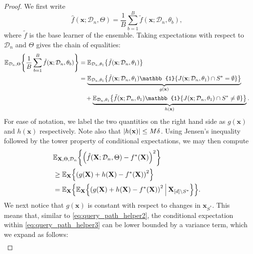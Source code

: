 \documentclass[11pt]{article}
\newcommand{\bx}{\mathbf{x}}
\newcommand{\bX}{\mathbf{X}}
\DeclarePairedDelimiter{\braces}{\lbrace}{\rbrace}
\DeclarePairedDelimiter{\paren}{(}{)}
\DeclarePairedDelimiter{\abs}{|}{|}
\newcommand{\E}{\mathbb{E}}
\newcommand{\indicator}{\mathbb{1}}
\newcommand{\nfeats}{d}
\newcommand{\coordindices}{[\nfeats]}
\newcommand{\data}[1][n]{\mathcal{D}_{#1}}
\newcommand{\suppset}{S^*}
\begin{document}
\begin{proof}
    We first write
    \begin{equation}
        \hat f(\bx;\data,\Theta) = \frac{1}{B}\sum_{b=1}^B \tilde f(\bx;\data,\theta_b),
    \end{equation}
    where $\tilde f$ is the base learner of the ensemble.
    Taking expectations with respect to $\data$ and $\Theta$ gives the chain of equalities:
    \begin{equation}
        \begin{split}
            \E_{\data,\Theta}\braces*{\frac{1}{B}\sum_{b=1}^B \tilde f(\bx;\data,\theta_b)}
            & = \E_{\data,\theta_1}\braces*{\tilde f(\bx;\data,\theta_1)} \\
            & = \underbrace{\E_{\data,\theta_1}\braces*{\tilde f(\bx;\data,\theta_1)\indicator\braces*{J(\bx;\data,\theta_1)\cap \suppset = \emptyset }}}_{g(\bx)} \\
            & \quad + \underbrace{\E_{\data,\theta_1}\braces*{\tilde f(\bx;\data,\theta_1)\indicator\braces*{J(\bx;\data,\theta_1)\cap \suppset \neq \emptyset }}}_{h(\bx)}.
        \end{split}
    \end{equation}
    For ease of notation, we label the two quantities on the right hand side as $g(\bx)$ and $h(\bx)$ respectively.
    Note also that $\abs*{h(\bx)} \leq M\delta$.
    Using Jensen's inequality followed by the tower property of conditional expectations, we may then compute 
    \begin{equation}
    \label{eq:query_path_helper3}
    \begin{split}
        & \E_{\bX,\Theta,\data}\braces*{\paren*{\hat f(\bX;\data,\Theta) - f^*(\bX)}^2} \\
        & \geq \E_\bX\braces*{\paren*{g(\bX) + h(\bX) - f^*(\bX)}^2} \\
        & = \E_\bX\braces*{\E_{\bX}\braces*{\paren*{g(\bX) + h(\bX) - f^*(\bX)}^2~\vline~ \bX_{\coordindices\backslash\suppset}}}.
    \end{split}
    \end{equation}
    We next notice that $g(\bx)$ is constant with respect to changes in $\bx_{\suppset}$.
    This means that, similar to \eqref{eq:query_path_helper2}, the conditional expectation within \eqref{eq:query_path_helper3} can be lower bounded by a variance term, which we expand as follows:
    \begin{equation} \label{eq:query_path_helper4}
        \begin{split}

\end{split}
\end{equation}
\end{proof}
\end{document}
